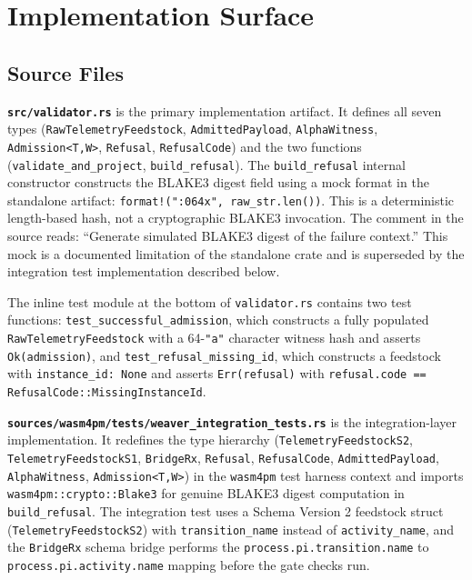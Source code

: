 
\section{Implementation Surface}
\label{sec:otel-weaver-exp-003-live-check-to-refusal-implementation}

\subsection{Source Files}
\label{sec:otel-weaver-exp-003-live-check-to-refusal-implementation-sources}

\textbf{\texttt{src/validator.rs}} is the primary implementation artifact. It defines
all seven types (\texttt{RawTelemetryFeedstock}, \texttt{AdmittedPayload},
\texttt{AlphaWitness}, \texttt{Admission<T,W>}, \texttt{Refusal}, \texttt{RefusalCode})
and the two functions (\texttt{validate\_and\_project}, \texttt{build\_refusal}).
The \texttt{build\_refusal} internal constructor constructs the BLAKE3 digest field
using a mock format in the standalone artifact: \texttt{format!("{:064x}", raw\_str.len())}.
This is a deterministic length-based hash, not a cryptographic BLAKE3 invocation.
The comment in the source reads: ``Generate simulated BLAKE3 digest of the failure
context.'' This mock is a documented limitation of the standalone crate and is
superseded by the integration test implementation described below.

The inline test module at the bottom of \texttt{validator.rs} contains two test
functions: \texttt{test\_successful\_admission}, which constructs a fully populated
\texttt{RawTelemetryFeedstock} with a 64-\texttt{"a"} character witness hash and
asserts \texttt{Ok(admission)}, and \texttt{test\_refusal\_missing\_id}, which
constructs a feedstock with \texttt{instance\_id: None} and asserts
\texttt{Err(refusal)} with \texttt{refusal.code == RefusalCode::MissingInstanceId}.

\textbf{\texttt{sources/wasm4pm/tests/weaver\_integration\_tests.rs}} is the
integration-layer implementation. It redefines the type hierarchy (\texttt{TelemetryFeedstockS2},
\texttt{TelemetryFeedstockS1}, \texttt{BridgeRx}, \texttt{Refusal}, \texttt{RefusalCode},
\texttt{AdmittedPayload}, \texttt{AlphaWitness}, \texttt{Admission<T,W>}) in the
\texttt{wasm4pm} test harness context and imports \texttt{wasm4pm::crypto::Blake3}
for genuine BLAKE3 digest computation in \texttt{build\_refusal}. The integration
test uses a Schema Version 2 feedstock struct (\texttt{TelemetryFeedstockS2}) with
\texttt{transition\_name} instead of \texttt{activity\_name}, and the \texttt{BridgeRx}
schema bridge performs the \texttt{process.pi.transition.name} to
\texttt{process.pi.activity.name} mapping before the gate checks run.


